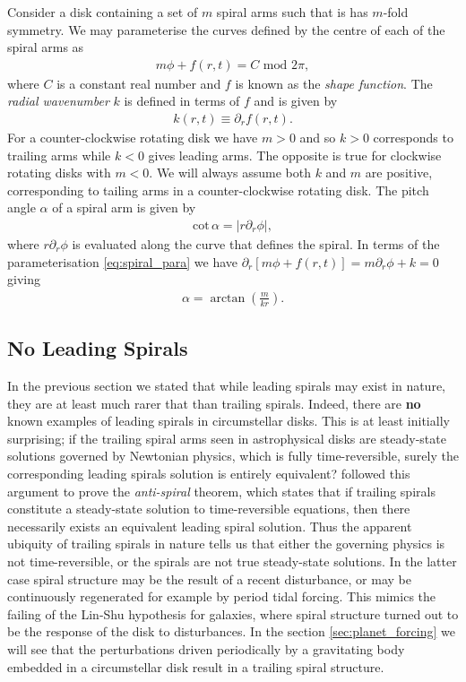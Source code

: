 Consider a disk containing a set of $m$ spiral arms such that is has $m$-fold symmetry. We may parameterise the curves defined by the centre of each of the spiral arms as
\begin{align}
    m\phi + f(r,t) = C \,\, \mathrm{mod} \,\, 2\pi, \label{eq:spiral_para}
\end{align}
where $C$ is a constant real number and $f$ is known as the \textit{shape function}. The \textit{radial wavenumber} $k$ is defined in terms of $f$ and is given by
\begin{align}
    k(r,t) \equiv \partial_r f(r,t).
\end{align}
For a counter-clockwise rotating disk we have $m>0$ and so $k>0$ corresponds to trailing arms while $k<0$ gives leading arms. 
The opposite is true for clockwise rotating disks with $m<0$. 
We will always assume both $k$ and $m$ are positive, corresponding to tailing arms in a counter-clockwise rotating disk. 
The pitch angle $\alpha$ of a spiral arm is given by
\begin{align}
    \mathrm{cot}\,\alpha = \left| r \partial_r \phi \right|,
\end{align}
where $r \partial_r \phi$ is evaluated along the curve that defines the spiral. In terms of the parameterisation \ref{eq:spiral_para} we have $\partial_r[m\phi+f(r,t)] = m \partial_r \phi + k = 0$ giving
\begin{align}
    \alpha = \arctan \left( \frac{m}{kr} \right). \label{eq:pitchangle}
\end{align}

\subsection{No Leading Spirals}

In the previous section we stated that while leading spirals may exist in nature, they are at least much rarer that than trailing spirals. 
Indeed, there are \textbf{no} known examples of leading spirals in circumstellar disks.
This is at least initially surprising; if the trailing spiral arms seen in astrophysical disks are steady-state solutions governed by Newtonian physics, which is fully time-reversible, surely the corresponding leading spirals solution is entirely equivalent?
\citet{lynden-bell1967} followed this argument to prove the \textit{anti-spiral} theorem, which states that if trailing spirals constitute a steady-state solution to time-reversible equations, then there necessarily exists an equivalent leading spiral solution.
Thus the apparent ubiquity of trailing spirals in nature tells us that either the governing physics is not time-reversible, or the spirals are not true steady-state solutions.
In the latter case spiral structure may be the result of a recent disturbance, or may be continuously regenerated for example by period tidal forcing.
This mimics the failing of the Lin-Shu hypothesis for galaxies, where spiral structure turned out to be the response of the disk to disturbances.
In the section \ref{sec:planet_forcing} we will see that the perturbations driven periodically by a gravitating body embedded in a circumstellar disk result in a trailing spiral structure.

